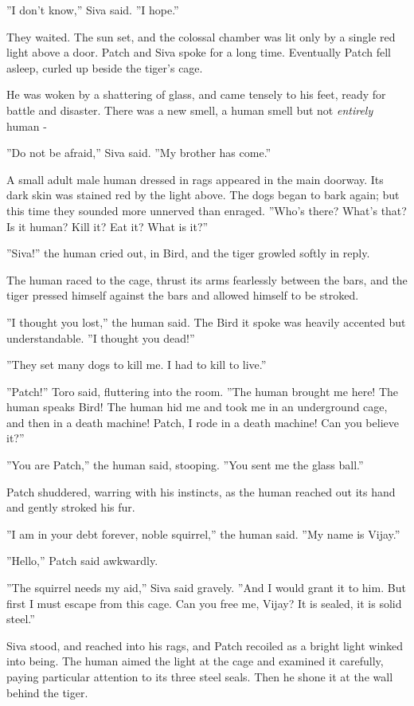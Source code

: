 \documentclass[12pt]{book}
\begin{document}
 ''I don't know,'' Siva said. ''I hope.''\par
 They waited. The sun set, and the colossal chamber was lit only by a single red light above a door. Patch and Siva spoke for a long time. Eventually Patch fell asleep, curled up beside the tiger's cage.\par
He was woken by a shattering of glass, and came tensely to his feet, ready for battle and disaster. There was a new smell, a human smell %
 but not {\it entirely} human -\par
 ''Do not be afraid,'' Siva said. ''My brother has come.''\par
 A small adult male human dressed in rags appeared in the main doorway. Its dark skin was stained red by the light above. The dogs began to bark again; but this time they sounded more unnerved than enraged. ''Who's there? What's that? Is it human? Kill it? Eat it? What is it?''\par
 ''Siva!'' the human cried out, in Bird, and the tiger growled softly in reply.\par
 The human raced to the cage, thrust its arms fearlessly between the bars, and the tiger pressed himself against the bars and allowed himself to be stroked.\par
 ''I thought you lost,'' the human said. The Bird it spoke was heavily accented but understandable. ''I thought you dead!''\par
 ''They set many dogs to kill me. I had to kill to live.''\par
 ''Patch!'' Toro said, fluttering into the room. ''The human brought me here! The human speaks Bird! The human hid me and took me in an underground cage, and then in a death machine! Patch, I rode in a death machine! Can you believe it?''\par
 ''You are Patch,'' the human said, stooping. ''You sent me the glass ball.''\par
 Patch shuddered, warring with his instincts, as the human reached out its hand and gently stroked his fur.\par
 ''I am in your debt forever, noble squirrel,'' the human said. ''My name is Vijay.''\par
 ''Hello,'' Patch said awkwardly.\par
 ''The squirrel needs my aid,'' Siva said gravely. ''And I would grant it to him. But first I must escape from this cage. Can you free me, Vijay? It is sealed, it is solid steel.''\par
 Siva stood, and reached into his rags, and Patch recoiled as a bright light winked into being. The human aimed the light at the cage and examined it carefully, paying particular attention to its three steel seals. Then he shone it at the wall behind the tiger.\par
\end{document}

